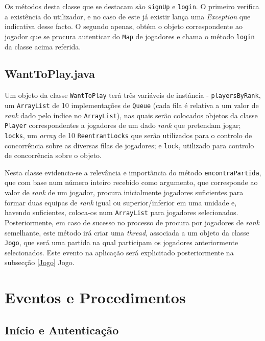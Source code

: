 \documentclass{llncs}
\begin{document}
Os métodos desta classe que se destacam são \texttt{signUp} e \texttt{login}. O 
primeiro verifica a existência do utilizador, e no caso de este já existir lança 
uma \textit{Exception} que indicativa desse facto. O segundo apenas, obtém o objeto 
correspondente ao jogador que se procura autenticar do \texttt{Map} de jogadores e 
chama o método \texttt{login} da classe acima referida. 

\subsection{WantToPlay.java}

Um objeto da classe \texttt{WantToPlay} terá três variáveis de instância - 
\texttt{playersByRank}, um \texttt{ArrayList} de 10 implementações de 
\texttt{Queue} (cada fila é relativa a um valor de \textit{rank} dado pelo
índice no \texttt{ArrayList}), nas quais serão colocados objetos da classe 
\texttt{Player} correspondentes a jogadores de um dado \textit{rank} que 
pretendam jogar; \texttt{locks}, um \textit{array} de 10 
\texttt{ReentrantLocks} que serão utilizados para o controlo de 
concorrência sobre as diversas filas de jogadores; e \texttt{lock}, 
utilizado para controlo de concorrência sobre o objeto.

Nesta classe evidencia-se a relevância e importância do método 
\texttt{encontraPartida}, que com base num número inteiro recebido como 
argumento, que corresponde ao valor de \textit{rank} de um jogador, procura 
inicialmente jogadores suficientes para formar duas equipas de \textit{rank} 
igual ou superior/inferior em uma unidade e, havendo suficientes, coloca-os num 
\texttt{ArrayList} para jogadores selecionados. Posteriormente, em caso de 
sucesso no processo de procura por jogadores de \textit{rank} semelhante, 
este método irá criar uma \textit{thread}, associada a um objeto da classe 
\texttt{Jogo}, que será uma partida na qual participam os jogadores anteriormente 
selecionados. Este evento na aplicação será explicitado posteriormente na 
subsecção \ref{Jogo} Jogo.

\section{Eventos e Procedimentos}

\subsection{Início e Autenticação}
\end{document}
